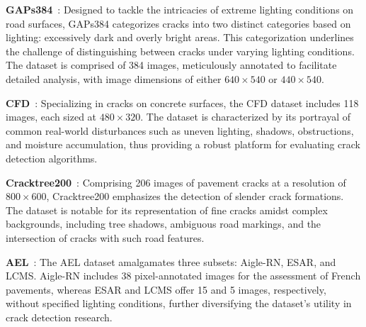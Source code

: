\documentclass[journal]{IEEEtran}
\begin{document}
\textbf{GAPs384}~\cite{DBLP:conf/ijcnn/EisenbachSSADSE17}: Designed to tackle the intricacies of extreme lighting conditions on road surfaces, GAPs384 categorizes cracks into two distinct categories based on lighting: excessively dark and overly bright areas. This categorization underlines the challenge of distinguishing between cracks under varying lighting conditions. The dataset is comprised of 384 images, meticulously annotated to facilitate detailed analysis, with image dimensions of either $640 \times 540$ or $440 \times 540$.

\textbf{CFD}~\cite{DBLP:journals/tits/ShiCQMC16}: Specializing in cracks on concrete surfaces, the CFD dataset includes 118 images, each sized at $480 \times 320$. The dataset is characterized by its portrayal of common real-world disturbances such as uneven lighting, shadows, obstructions, and moisture accumulation, thus providing a robust platform for evaluating crack detection algorithms.

\textbf{Cracktree200}~\cite{DBLP:journals/prl/ZouCLMW12}: Comprising 206 images of pavement cracks at a resolution of $800 \times 600$, Cracktree200 emphasizes the detection of slender crack formations. The dataset is notable for its representation of fine cracks amidst complex backgrounds, including tree shadows, ambiguous road markings, and the intersection of cracks with such road features.



\textbf{AEL}~\cite{DBLP:journals/tits/AmhazCIB16}: The AEL dataset amalgamates three subsets: Aigle-RN, ESAR, and LCMS. Aigle-RN includes 38 pixel-annotated images for the assessment of French pavements, whereas ESAR and LCMS offer 15 and 5 images, respectively, without specified lighting conditions, further diversifying the dataset's utility in crack detection research.















\end{document}
